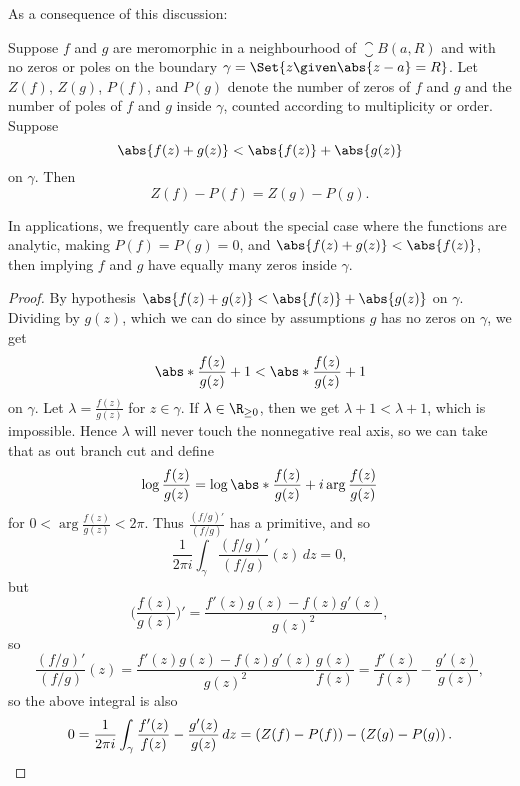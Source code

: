 As a consequence of this discussion:

\begin{theorem}\label{thm5.8}
	Suppose $f$ and $g$ are meromorphic in a neighbourhood of $\closure{B(a, R)}$ and with no zeros or poles on the boundary $\gamma = \Set{z \given \abs{z - a} = R}$.
	Let $Z(f)$, $Z(g)$, $P(f)$, and $P(g)$ denote the number of zeros of $f$ and $g$ and the number of poles of $f$ and $g$ inside $\gamma$, counted according to multiplicity or order.
	Suppose
	\[
		\abs{f(z) + g(z)} < \abs{f(z)} + \abs{g(z)}
	\]
	on $\gamma$.
	Then
	\[
		Z(f) - P(f) = Z(g) - P(g).
	\]
\end{theorem}

\begin{remark}
	In applications, we frequently care about the special case where the functions are analytic, making $P(f) = P(g) = 0$, and $\abs{f(z) + g(z)} < \abs{f(z)}$, then implying $f$ and $g$ have equally many zeros inside $\gamma$.
\end{remark}

\begin{proof}
	By hypothesis $\abs{f(z) + g(z)} < \abs{f(z)} + \abs{g(z)}$ on $\gamma$.
	Dividing by $g(z)$, which we can do since by assumptions $g$ has no zeros on $\gamma$, we get
	\[
		\abs*{\frac{f(z)}{g(z)} + 1} < \abs*{\frac{f(z)}{g(z)}} + 1
	\]
	on $\gamma$.
	Let $\lambda = \frac{f(z)}{g(z)}$ for $z \in \gamma$.
	If $\lambda \in \R_{\geq 0}$, then we get $\lambda + 1 < \lambda + 1$, which is impossible.
	Hence $\lambda$ will never touch the nonnegative real axis, so we can take that as out branch cut and define
	\[
		\log \frac{f(z)}{g(z)} = \log \abs*{\frac{f(z)}{g(z)}} + i \arg \frac{f(z)}{g(z)}
	\]
	for $0 < \arg \frac{f(z)}{g(z)} < 2 \pi$.
	Thus $\frac{(f / g)'}{(f / g)}$ has a primitive, and so
	\[
		\frac{1}{2 \pi i} \int_\gamma \frac{(f / g)'}{(f / g)}(z) \, d z = 0,
	\]
	but
	\[
		\biggl ( \frac{f(z)}{g(z)} \biggr )' = \frac{f'(z) g(z) - f(z) g'(z)}{g(z)^2},
	\]
	so
	\[
		\frac{(f / g)'}{(f / g)}(z) = \frac{f'(z) g(z) - f(z) g'(z)}{g(z)^2} \frac{g(z)}{f(z)} = \frac{f'(z)}{f(z)} - \frac{g'(z)}{g(z)},
	\]
	so the above integral is also
	\[
		0 = \frac{1}{2 \pi i} \int_\gamma \frac{f'(z)}{f(z)} - \frac{g'(z)}{g(z)} \, d z = \left ( Z(f) - P(f) \right ) - \left (Z(g) - P(g) \right ). \qedhere
	\]
\end{proof}
